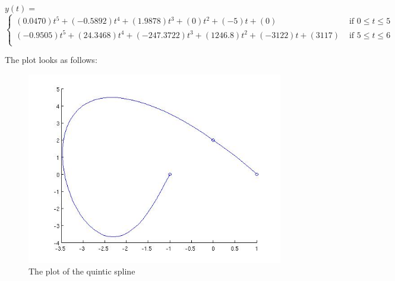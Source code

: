 \documentclass[english]{article}
\begin{document}
\begin{enumerate}
\(y(t) = \)
\[
\begin{cases}
(0.0470)t^5 + (-0.5892)t^4 + (1.9878)t^3 + (0)t^2 + (-5)t + (0) & \textrm{ if } 0 \leq t \leq 5 \\
(-0.9505)t^5 + (24.3468)t^4 + (-247.3722)t^3 + (1246.8)t^2 + (-3122)t + (3117) & \textrm{ if } 5 \leq t \leq 6 \\
\end{cases}
\]


The plot looks as follows:
\begin{figure}[H]
\centering
\includegraphics[scale=0.5]{quinticspline.jpg}
\caption{The plot of the quintic spline}
\end{figure}


\end{enumerate}
\end{document}
